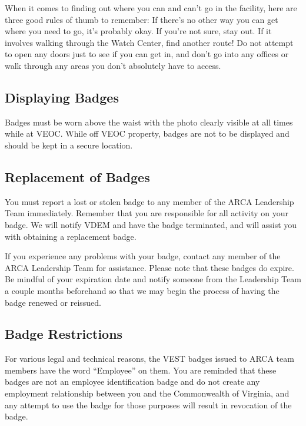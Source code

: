 \documentclass[pdflatex,letterpaper,twoside,12pt]{book}
\begin{document}
When it comes to finding out where you can and can't go in the facility, here are three good rules of thumb to remember:  If there's no other way you can get where you need to go, it's probably okay.  If you're not sure, stay out.  If it involves walking through the Watch Center, find another route!  Do not attempt to open any doors just to see if you can get in, and don't go into any offices or walk through any areas you don't absolutely have to access.

\subsection{Displaying Badges}

Badges must be worn above the waist with the photo clearly visible at all times while at VEOC.  While off VEOC property, badges are not to be displayed and should be kept in a secure location.

\subsection{Replacement of Badges}

You must report a lost or stolen badge to any member of the ARCA Leadership Team immediately.  Remember that you are responsible for all activity on your badge.  We will notify VDEM and have the badge terminated, and will assist you with obtaining a replacement  badge.

If you experience any problems with your badge, contact any member of the ARCA Leadership Team for assistance.  Please note that these badges do expire.  Be mindful of your expiration date and notify someone from the Leadership Team a couple months beforehand so that we may begin the process of having the badge renewed or reissued.

\subsection{Badge Restrictions}

For various legal and technical reasons, the VEST badges issued to ARCA team members have the word ``Employee'' on them.  You are reminded that these badges are not an employee identification badge and do not create any employment relationship between you and the Commonwealth of Virginia, and any attempt to use the badge for those purposes will result in revocation of the badge.

\end{document}
